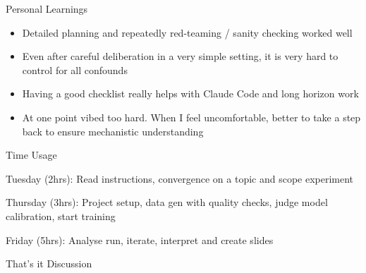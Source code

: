 \documentclass[aspectratio=169,11pt]{beamer}
\begin{document}
\begin{frame}{Personal Learnings}
	\begin{itemize}
		\item Detailed planning and repeatedly red-teaming / sanity checking worked well
		\item Even after careful deliberation in a very simple setting, it is very hard to control for all confounds
		\item Having a good checklist really helps with Claude Code and long horizon work
		\item At one point vibed too hard. When I feel uncomfortable, better to take a step back to ensure mechanistic understanding
	\end{itemize}
\end{frame}
\begin{frame}{Time Usage}

	Tuesday (2hrs): Read instructions, convergence on a topic and scope experiment

	\bigskip
	Thursday (3hrs): Project setup, data gen with quality checks, judge model calibration, start training

	\bigskip
	Friday (5hrs): Analyse run, iterate, interpret and create slides

\end{frame}

\begin{frame}{That's it}
	\centering
	\Large
	Discussion
\end{frame}




\end{document}
